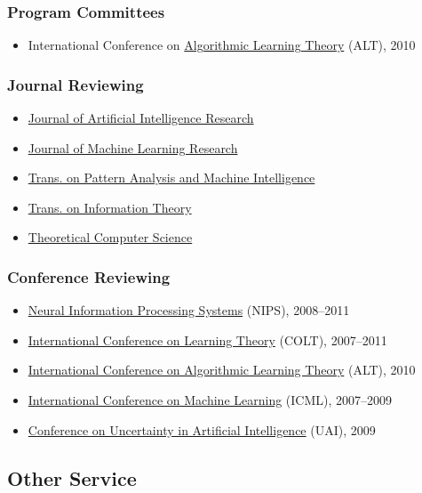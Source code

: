 \documentclass{article}
\begin{document}
\hypertarget{program_committees}{}\subsubsection*{{Program Committees}}\label{program_committees}

\begin{itemize}%
\item International Conference on \href{http://www-alg.ist.hokudai.ac.jp/~thomas/ALT10/pc.html}{Algorithmic Learning Theory} (ALT), 2010

\end{itemize}
\hypertarget{journal_reviewing}{}\subsubsection*{{Journal Reviewing}}\label{journal_reviewing}

\begin{itemize}%
\item \href{http://www.jair.org/}{Journal of Artificial Intelligence Research}
\item \href{http://jmlr.csail.mit.edu/}{Journal of Machine Learning Research}
\item \href{http://www.computer.org/tpami/}{Trans. on Pattern Analysis and Machine Intelligence}
\item \href{http://ieeexplore.ieee.org/xpl/RecentIssue.jsp?punumber=18}{Trans. on Information Theory}
\item \href{http://www.elsevier.com/locate/tcs}{Theoretical Computer Science}

\end{itemize}
\hypertarget{conference_reviewing}{}\subsubsection*{{Conference Reviewing}}\label{conference_reviewing}

\begin{itemize}%
\item \href{http://nips.cc/}{Neural Information Processing Systems} (NIPS), 2008--{}2011
\item \href{http://www.learningtheory.org/}{International Conference on Learning Theory} (COLT), 2007--{}2011
\item \href{http://www-alg.ist.hokudai.ac.jp/~thomas/ALTARCH/altarch.jhtml}{International Conference on Algorithmic Learning Theory} (ALT), 2010
\item \href{http://www.machinelearning.org/icml.html}{International Conference on Machine Learning} (ICML), 2007--{}2009
\item \href{http://www.auai.org/}{Conference on Uncertainty in Artificial Intelligence} (UAI), 2009

\end{itemize}
\hypertarget{other_service}{}\subsection*{{Other Service}}\label{other_service}
\end{document}
